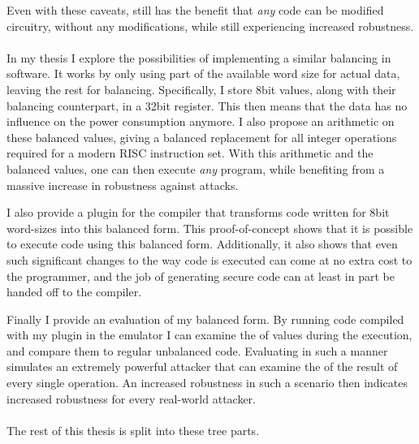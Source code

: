 Even with these caveats, \dual{} still has the benefit that \emph{any} code can be modified circuitry, without any modifications, while still experiencing increased robustness.
\\
\\
In my thesis I explore the possibilities of implementing a similar balancing in software.
It works by only using part of the available word size for actual data, leaving the rest for balancing.
Specifically, I store 8bit values, along with their balancing counterpart, in a 32bit register.
This then means that the data has no influence on the power consumption anymore.
I also propose an arithmetic on these balanced values, giving a balanced replacement for all integer operations required for a modern RISC instruction set.
With this arithmetic and the balanced values, one can then execute \emph{any} program, while benefiting from a massive increase in robustness against \poweranalysis{} attacks.

I also provide a plugin for the \llvm{} compiler that transforms code written for 8bit word-sizes into this balanced form.
This proof-of-concept shows that it is possible to execute code using this balanced form.
Additionally, it also shows that even such significant changes to the way code is executed can come at no extra cost to the programmer, and the job of generating secure code can at least in part be handed off to the compiler.

Finally I provide an evaluation of my balanced form.
By running code compiled with my plugin in the \qemu{} emulator I can examine the \hammingw{} of values during the execution, and compare them to regular unbalanced code.
Evaluating in such a manner simulates an extremely powerful attacker that can examine the \hammingw{} of the result of every single operation.
An increased robustness in such a scenario then indicates increased robustness for every real-world attacker.
\\
\\
The rest of this thesis is split into these tree parts.

